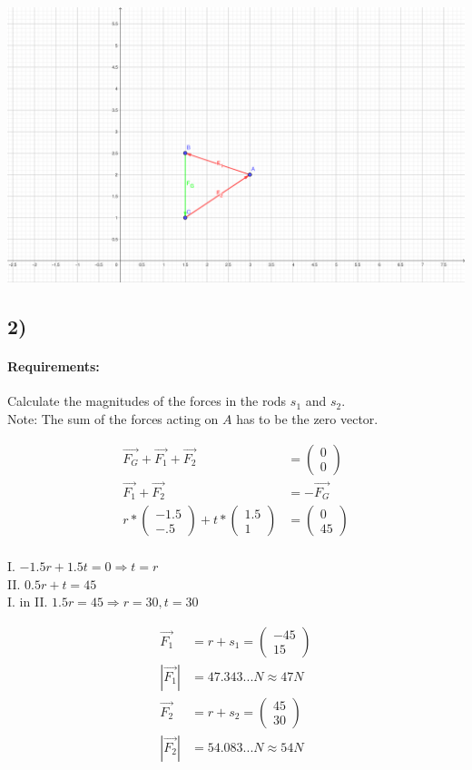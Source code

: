 \includegraphics[width=\linewidth]{images/8-37-2.png}

\subsection{2)}
\paragraph{Requirements:}
Calculate the magnitudes of the forces in the rods  $s_1$ and $s_2$. \\ 
Note: The sum of the forces acting on $A$ has to be the zero vector.

\begin{align}
   \vec{F_G} + \vec{F_1} + \vec{F_2} &= \begin{pmatrix}
       0 \\ 
       0
   \end{pmatrix} \\
   \vec{F_1} + \vec{F_2} &= -\vec{F_G} \\
   r * \begin{pmatrix}
       -1.5 \\ 
       -.5
   \end{pmatrix} + t * \begin{pmatrix}
       1.5 \\ 
       1 
   \end{pmatrix} &= \begin{pmatrix}
       0 \\  
       45
   \end{pmatrix}
\end{align} \\
I.  $-1.5r + 1.5t = 0 \Rightarrow t = r$ \\
II. $0.5r + t = 45$ \\
I. in II.   $1.5r = 45 \Rightarrow r = 30, t = 30$

\begin{align}
   \vec{F_1} &= r + s_1 = \begin{pmatrix}
       -45  \\
       15
   \end{pmatrix} \\
   |\vec{F_1}| &= 47.343... N \approx 47N \\[20pt]
   \vec{F_2} &= r + s_2 = \begin{pmatrix}
       45  \\
       30
   \end{pmatrix} \\
   |\vec{F_2}| &= 54.083... N \approx 54N
\end{align}
